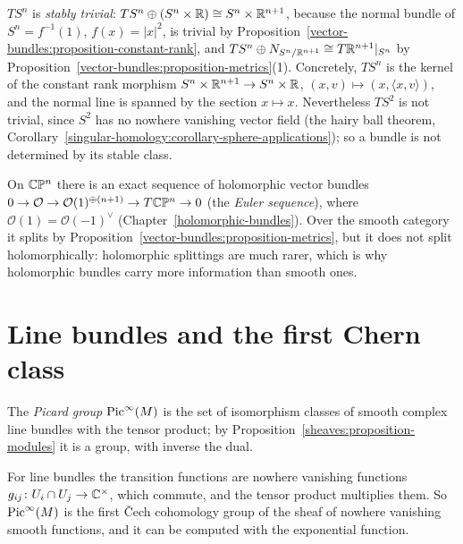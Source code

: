 \begin{example}\label{vector-bundles:example-stably-trivial}
$TS^n$ is \emph{stably trivial}: $TS^n \oplus (S^n \times \mathbb{R}) \cong S^n \times \mathbb{R}^{n+1}$, because the normal bundle of $S^n = f^{-1}(1)$, $f(x) = |x|^2$, is trivial by Proposition~\ref{vector-bundles:proposition-constant-rank}, and
$TS^n \oplus N_{S^n/\mathbb{R}^{n+1}} \cong T\mathbb{R}^{n+1}|_{S^n}$ by Proposition~\ref{vector-bundles:proposition-metrics}(1). Concretely, $TS^n$ is the kernel of the constant rank morphism
$S^n \times \mathbb{R}^{n+1} \to S^n \times \mathbb{R}$, $(x, v) \mapsto (x, \langle x, v\rangle)$, and the normal line is spanned by the section $x \mapsto x$. Nevertheless $TS^2$ is not trivial,
since $S^2$ has no nowhere vanishing vector field (the hairy ball theorem, Corollary~\ref{singular-homology:corollary-sphere-applications}); so a bundle is not determined by its stable class.
\end{example}

\begin{example}\label{vector-bundles:example-euler-sequence}
On $\mathbb{C}\mathbb{P}^n$ there is an exact sequence of holomorphic vector bundles
$0 \to \mathcal{O} \to \mathcal{O}(1)^{\oplus(n+1)} \to T\mathbb{C}\mathbb{P}^n \to 0$ (the \emph{Euler sequence}), where $\mathcal{O}(1) = \mathcal{O}(-1)^\vee$ (Chapter~\ref{holomorphic-bundles}). Over the smooth category it
splits by Proposition~\ref{vector-bundles:proposition-metrics}, but it does not split holomorphically: holomorphic splittings are much rarer, which is why holomorphic bundles carry more information than
smooth ones.
\end{example}

\section{Line bundles and the first Chern class}\label{vector-bundles:section-line-bundles}

\begin{definition}\label{vector-bundles:definition-picard}
The \emph{Picard group} $\operatorname{Pic}^\infty(M)$ is the set of isomorphism classes of smooth complex line bundles with the tensor product; by Proposition~\ref{sheaves:proposition-modules} it is a group, with
inverse the dual.
\end{definition}

For line bundles the transition functions are nowhere vanishing functions $g_{ij} \colon U_i \cap U_j \to \mathbb{C}^\times$, which commute, and the tensor product multiplies them. So
$\operatorname{Pic}^\infty(M)$ is the first \v{C}ech cohomology group of the sheaf of nowhere vanishing smooth functions, and it can be computed with the exponential function.

